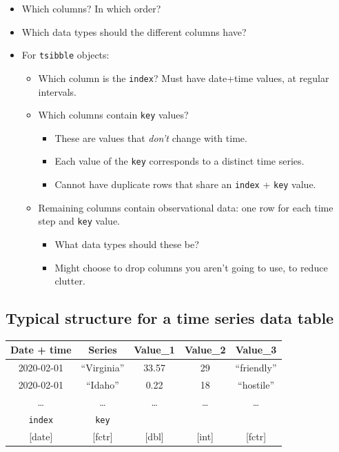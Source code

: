\documentclass[
]{book}
\providecommand{\tightlist}{%
  \setlength{\itemsep}{0pt}\setlength{\parskip}{0pt}}
\begin{document}
\begin{itemize}
\tightlist
\item
  Which columns? In which order?
\item
  Which data types should the different columns have?
\item
  For \texttt{tsibble} objects:

  \begin{itemize}
  \tightlist
  \item
    Which column is the \texttt{index}? Must have date+time values, at regular intervals.
  \item
    Which columns contain \texttt{key} values?

    \begin{itemize}
    \tightlist
    \item
      These are values that \emph{don't} change with time.
    \item
      Each value of the \texttt{key} corresponds to a distinct time series.
    \item
      Cannot have duplicate rows that share an \texttt{index} + \texttt{key} value.
    \end{itemize}
  \item
    Remaining columns contain observational data: one row for each time step and \texttt{key} value.

    \begin{itemize}
    \tightlist
    \item
      What data types should these be?
    \item
      Might choose to drop columns you aren't going to use, to reduce clutter.
    \end{itemize}
  \end{itemize}
\end{itemize}

\hypertarget{ts-table}{%
\subsection{Typical structure for a time series data table}\label{ts-table}}

\begin{longtable}[]{@{}ccccc@{}}
\toprule
Date + time & Series & Value\_1 & Value\_2 & Value\_3 \\
\midrule
\endhead
2020-02-01 & ``Virginia'' & 33.57 & 29 & ``friendly'' \\
2020-02-01 & ``Idaho'' & 0.22 & 18 & ``hostile'' \\
\ldots{} & \ldots{} & \ldots{} & \ldots{} & \ldots{} \\
\texttt{index} & \texttt{key} & & & \\
{[}date{]} & {[}fctr{]} & {[}dbl{]} & {[}int{]} & {[}fctr{]} \\
\bottomrule
\end{longtable}
\end{document}
